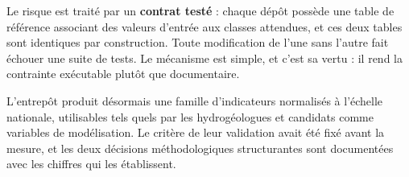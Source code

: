 Le risque est traité par un \textbf{contrat testé} : chaque dépôt possède une table de référence
associant des valeurs d'entrée aux classes attendues, et ces deux tables sont identiques par
construction. Toute modification de l'une sans l'autre fait échouer une suite de tests. Le
mécanisme est simple, et c'est sa vertu : il rend la contrainte exécutable plutôt que
documentaire.

L'entrepôt produit désormais une famille d'indicateurs normalisés à l'échelle nationale,
utilisables tels quels par les hydrogéologues et candidats comme variables de modélisation. Le
critère de leur validation avait été fixé avant la mesure, et les deux décisions
méthodologiques structurantes sont documentées avec les chiffres qui les établissent.
